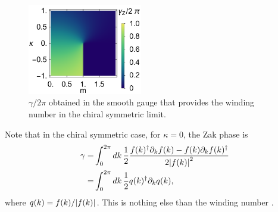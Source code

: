 \documentclass[twocolumn,amsmath,longbibliography,amssymb,superscriptaddress]{revtex4-1}
\begin{document}
\begin{figure}[t]
	\centering
	\includegraphics[width=50mm]{figApp.pdf}
	\caption{$\gamma/2\pi$ obtained in the smooth gauge that provides the winding number in the chiral symmetric limit.}
	\label{fig:ssh_zak}
\end{figure}

Note that in the chiral symmetric case, for $\kappa = 0$, the Zak phase is
\begin{align}
\gamma =& \int_0^{2\pi} dk\,\frac{1}{2}\frac{f(k)^\dagger \partial_k f(k)-f(k)\partial_k f(k)^\dagger}{2\abs{f(k)}^2} \nonumber \\
=& \int_0^{2\pi} dk\,\frac{1}{2}q(k)^\dagger \partial_k q(k),
\end{align}
where $q(k) = f(k)/\abs{f(k)}$. This is nothing else than the winding number \cite{ryu2010topological}. 
\end{document}
